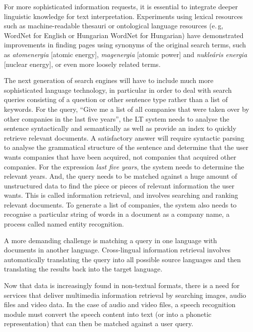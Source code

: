 \begin{multicols}{2}
  For more sophisticated information requests, it is essential to integrate deeper linguistic knowledge for text interpretation. Experiments using lexical resources such as machine-readable thesauri or ontological language resources (e.\,g, WordNet for English or Hungarian WordNet for Hungarian) have demonstrated improvements in finding pages using synonyms of the original search terms, such as \textit{atomenergia} [atomic energy], \textit{magenergia} [atomic power] and \textit{nukleáris energia} [nuclear energy], or even more loosely related terms.


  The next generation of search engines will have to include much more sophisticated language technology, in particular in order to deal with search queries consisting of a question or other sentence type rather than a list of keywords. For the query, "`Give me a list of all companies that were taken over by other companies in the last five years"', the LT system needs to analyse the sentence syntactically and semantically as well as provide an index to quickly retrieve relevant documents. A satisfactory answer will require syntactic parsing to analyse the grammatical structure of the sentence and determine that the user wants companies that have been acquired, not companies that acquired other companies. For the expression \textit{last five years}, the system needs to determine the relevant years. And, the query needs to be matched against a huge amount of unstructured data to find the piece or pieces of relevant information the user wants. This is called information retrieval, and involves searching and ranking relevant documents. To generate a list of companies, the system also needs to recognise a particular string of words in a document as a company name, a process called named entity recognition.

  A more demanding challenge is matching a query in one language with documents in another language. Cross-lingual information retrieval involves automatically translating the query into all possible source languages and then translating the results back into the target language. 

  Now that data is increasingly found in non-textual formats, there is a need for services that deliver multimedia information retrieval by searching images, audio files and video data. In the case of audio and video files, a speech recognition module must convert the speech content into text (or into a phonetic representation) that can then be matched against a user query.


\end{multicols}
